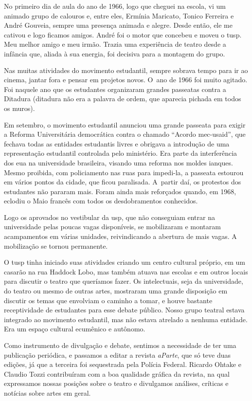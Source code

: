 No primeiro dia de aula do ano de 1966, logo que cheguei na escola, vi um
animado grupo de calouros e, entre eles, Ermínia Maricato, Tonico Ferreira
e André Gouveia, sempre uma presença animada e alegre. Desde então,
ele me cativou e logo ficamos amigos. André foi o motor que concebeu e moveu o
{\sc tusp}. Meu melhor amigo e meu irmão. Trazia uma experiência de teatro
desde a infância que, aliada à sua energia, foi decisiva para a montagem
do grupo.

Nas muitas atividades do movimento estudantil, sempre sobrava tempo para
ir ao cinema, jantar fora e pensar em projetos novos. O~ano de 1966 foi
muito agitado. Foi naquele ano que os estudantes organizaram grandes
passeatas contra a Ditadura ({\sc ditadura não} era a palavra de
ordem, que aparecia pichada em todos os muros).

Em setembro, o movimento estudantil anunciou uma grande passeata para
exigir a Reforma Universitária democrática contra o chamado “Acordo {\sc mec-usaid}”, que fechava todas as entidades estudantis livres e
obrigava a introdução de uma representação estudantil controlada pelo
ministério. Era parte da interferência dos {\sc eua} na universidade brasileira,
visando uma reforma nos moldes ianques. Mesmo proibida, com policiamento nas
ruas para impedi-la, a passeata estourou em vários pontos da cidade, que
ficou paralisada. A~partir daí, os protestos dos estudantes não pararam
mais. Foram ainda mais reforçados quando, em 1968, eclodiu o Maio francês com todos os
desdobramentos conhecidos.

Logo os aprovados no vestibular da {\sc usp}, que não conseguiam entrar na
universidade pelas poucas vagas disponíveis, se mobilizaram e
montaram acampamentos em várias unidades, reivindicando a abertura de
mais vagas. A mobilização se tornou permanente.

O {\sc tusp} tinha iniciado suas atividades criando um centro cultural próprio,
em um casarão na rua Haddock Lobo, mas também atuava nas escolas e em
outros locais para discutir o teatro que queríamos fazer. Os intelectuais,
seja da universidade, do teatro ou mesmo de outras artes, mostraram
uma grande disposição em discutir os temas que envolviam o caminho a
tomar, e houve bastante receptividade de estudantes para esse debate
público. Nosso grupo teatral estava integrado ao movimento estudantil,
mas não estava atrelado a nenhuma entidade. Era um espaço cultural
ecumênico e autônomo.

Como instrumento de divulgação e debate, sentimos a necessidade de ter uma
publicação periódica, e passamos a editar a revista {\it aParte}, que só teve
duas edições, já que a terceira foi sequestrada pela Polícia Federal.
Ricardo Ohtake e Claudio Tozzi contribuíram com a boa qualidade gráfica
da revista, na qual expressamos nossas posições
sobre o teatro e divulgamos análises, críticas e notícias sobre
artes em geral.

